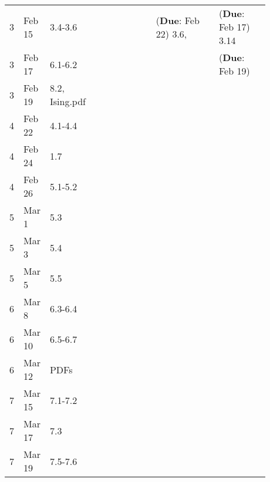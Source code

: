 \documentclass[12pt]{article}
\begin{document}
{\begin{table}[]
\begin{tabular}{p{0.03\linewidth}|p{0.08\linewidth}|p{0.065\linewidth}|p{0.25\linewidth}|p{0.25\linewidth}|p{0.2\linewidth}}
3  & Feb 15   & 3.4-3.6        &                           & (\textbf{Due}: Feb 22) 3.6,                                          & (\textbf{Due}: Feb 17) 3.14      \\
3  & Feb 17   & 6.1-6.2        &                           &                                                        & (\textbf{Due}: Feb 19)           \\
3  & Feb 19   & 8.2, Ising.pdf &                           &                                                        &                    \\
4  & Feb 22   & 4.1-4.4        &                           &                                                        &                    \\
4  & Feb 24   & 1.7            &                           &                                                        &                    \\
4  & Feb 26   & 5.1-5.2        &                           &                                                        &                    \\
5  & Mar 1    & 5.3            &                           &                                                        &                    \\
5  & Mar 3    & 5.4            &                           &                                                        &                    \\
5  & Mar 5    & 5.5            &                           &                                                        &                    \\
6  & Mar 8    & 6.3-6.4        &                           &                                                        &                    \\
6  & Mar 10   & 6.5-6.7        &                           &                                                        &                    \\
6  & Mar 12   & PDFs           &                           &                                                        &                    \\
7  & Mar 15   & 7.1-7.2        &                           &                                                        &                    \\
7  & Mar 17   & 7.3            &                           &                                                        &                    \\
7  & Mar 19   & 7.5-7.6        &                           &                                                        &                   \end{tabular}
\end{table}
}
\end{document}
